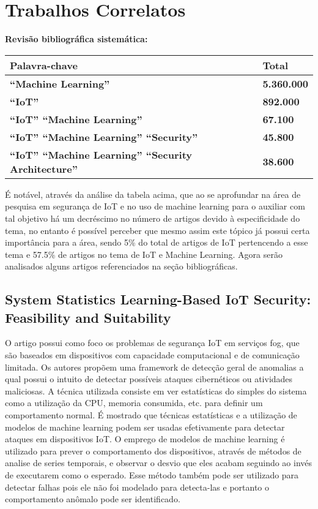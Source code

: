 \documentclass[article]{abntex2}
\begin{document}
\section{Trabalhos Correlatos}
\textbf{Revisão bibliográfica sistemática:}\\
\begin{tabular}{l l}
    \toprule
    \textbf{Palavra-chave}& \textbf{Total}  \\
    \midrule
    \textbf{``Machine Learning''}& \textbf{ 5.360.000 }\\
    \textbf{``IoT''}& \textbf{ 892.000 } \\
    \textbf{``IoT'' ``Machine Learning''}& \textbf{ 67.100 }\\
    \textbf{``IoT'' ``Machine Learning'' ``Security''}& \textbf{ 45.800 } \\
    \textbf{``IoT'' ``Machine Learning'' ``Security Architecture''}& \textbf{ 38.600 } \\
    \bottomrule
\end{tabular}

É notável, através da análise da tabela acima, que ao se aprofundar na área de pesquisa em segurança de IoT e no uso de machine learning para o auxiliar com tal objetivo há um decréscimo no número de artigos devido à especificidade do tema, no entanto é possível perceber que mesmo assim este tópico já possui certa importância para a área, sendo 5\% do total de artigos de IoT pertencendo a esse tema e 57.5\% de artigos no tema de IoT e Machine Learning. Agora serão analisados alguns artigos referenciados na seção bibliográficas.
\subsection{System Statistics Learning-Based IoT Security: Feasibility and Suitability}%
O artigo possui como foco os problemas de segurança IoT em serviços fog, que são baseados em dispositivos com capacidade computacional e de comunicação limitada. Os autores propõem uma framework de detecção geral de anomalias a qual possui o intuito de detectar possíveis ataques cibernéticos ou atividades maliciosas. A técnica utilizada consiste em ver estatísticas do simples do sistema como a utilização da CPU, memoria consumida, etc. para definir um comportamento normal. É mostrado que técnicas estatísticas e a utilização de modelos de machine learning podem ser usadas efetivamente para detectar ataques em dispositivos IoT. O emprego de modelos de machine learning é utilizado para prever o comportamento dos dispositivos, através  de métodos de analise de series temporais, e observar o desvio que eles acabam seguindo ao invés de executarem como o esperado. Esse método também pode ser utilizado para detectar falhas pois ele não foi modelado para detecta-las e portanto o comportamento anômalo pode ser identificado.
\end{document}
